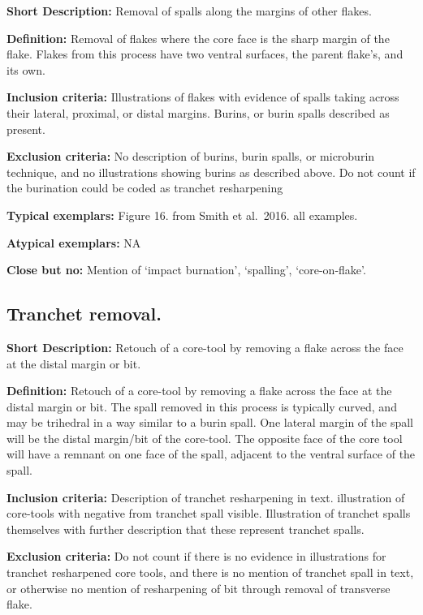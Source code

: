 \documentclass[
]{article}
\begin{document}
\textbf{Short Description:} Removal of spalls along the margins of other
flakes.

\textbf{Definition:} Removal of flakes where the core face is the sharp
margin of the flake. Flakes from this process have two ventral surfaces,
the parent flake's, and its own.

\textbf{Inclusion criteria:} Illustrations of flakes with evidence of
spalls taking across their lateral, proximal, or distal margins. Burins,
or burin spalls described as present.

\textbf{Exclusion criteria:} No description of burins, burin spalls, or
microburin technique, and no illustrations showing burins as described
above. Do not count if the burination could be coded as tranchet
resharpening

\textbf{Typical exemplars:} Figure 16. from Smith et al.~2016. all
examples.

\textbf{Atypical exemplars:} NA

\textbf{Close but no:} Mention of `impact burnation', `spalling',
`core-on-flake'.

\hypertarget{tranchet-removal.}{%
\subsection{Tranchet removal.}\label{tranchet-removal.}}

\textbf{Short Description:} Retouch of a core-tool by removing a flake
across the face at the distal margin or bit.

\textbf{Definition:} Retouch of a core-tool by removing a flake across
the face at the distal margin or bit. The spall removed in this process
is typically curved, and may be trihedral in a way similar to a burin
spall. One lateral margin of the spall will be the distal margin/bit of
the core-tool. The opposite face of the core tool will have a remnant on
one face of the spall, adjacent to the ventral surface of the spall.

\textbf{Inclusion criteria:} Description of tranchet resharpening in
text. illustration of core-tools with negative from tranchet spall
visible. Illustration of tranchet spalls themselves with further
description that these represent tranchet spalls.

\textbf{Exclusion criteria:} Do not count if there is no evidence in
illustrations for tranchet resharpened core tools, and there is no
mention of tranchet spall in text, or otherwise no mention of
resharpening of bit through removal of transverse flake.
\end{document}
